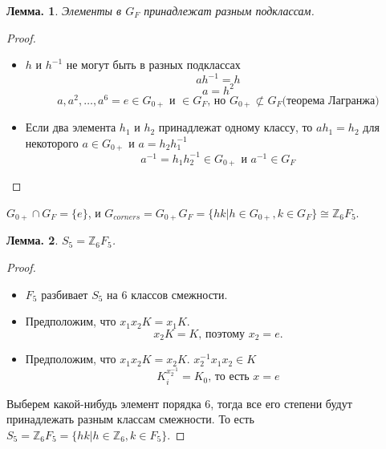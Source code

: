 \documentclass[utf8,russian]{beamer}
\newtheorem{ru_theo}{Лемма.}
\renewenvironment{theorem}{\begin{ru_theo}}{\end{ru_theo}}
\begin{document}
\begin{frame}
\begin{theorem}
	Элементы в $G_F$ принадлежат разным подклассам.
\end{theorem}
\begin{proof}
\begin{itemize}
	\item $h$ и $h^{-1}$ не могут быть в разных подклассах
	$$ah^{-1}=h$$
	$$a=h^2$$
	$$a,a^2,\ldots,a^6=e\in G_{0+}\text{ и }\in G_F\text{, но }G_{0+}\not\subset G_F\text{(теорема Лагранжа)}$$
	\item
	Если два элемента $h_1$ и $h_2$ принадлежат одному классу, то $ah_1=h_2$ для некоторого $a\in G_{0+}$ и $a=h_2h_1^{-1}$ $$a^{-1}=h_1h_2^{-1}\in G_{0+}\text{ и }a^{-1}\in G_F$$
\end{itemize}
\vspace*{-0.4cm}
\end{proof}
$G_{0+}\cap G_F=\{e\}$, и $G_{corners}=G_{0+}G_F=\{hk|h\in G_{0+},k\in G_F\}\cong\mathbb{Z}_6F_5$.
\end{frame}


\begin{frame}
\begin{theorem}
$S_5=\mathbb{Z}_6F_5$.
\end{theorem}
\begin{proof}
	\begin{itemize}
		\item $F_5$ разбивает $S_5$ на 6 классов смежности.
		\item Предположим, что $x_1x_2K=x_1K$. $$x_2K=K\text{, поэтому } x_2=e\text{.}$$
		\item Предположим, что $x_1x_2K=x_2K$. $x_2^{-1}x_1x_2\in K$
		$$K_i^{x_2^{-1}}=K_0\text{, то есть } x=e$$
	\end{itemize}
	Выберем какой-нибудь элемент порядка 6, тогда все его степени будут принадлежать разным классам смежности. То есть $S_5=\mathbb{Z}_6F_5=\{hk|h\in\mathbb{Z}_6,k\in F_5\}$.
\end{proof}
\end{frame}

\end{document}
